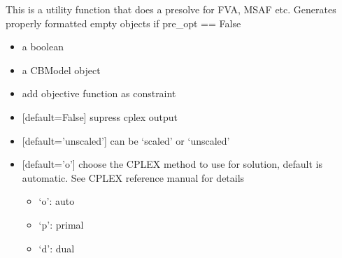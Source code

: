 \documentclass[letterpaper,10pt,english]{sphinxmanual}
\begin{document}
\begin{fulllineitems}
\label{\detokenize{modules_doc:cbmpy.CBCPLEX.cplx_func_GetCPXandPresolve}}
\pysigstartsignatures
{}
\pysigstopsignatures
\sphinxAtStartPar
This is a utility function that does a presolve for FVA, MSAF etc. Generates properly formatted
empty objects if pre\_opt == False
\begin{itemize}
\item {} 
\sphinxAtStartPar
{} a boolean

\item {} 
\sphinxAtStartPar
{} a CBModel object

\item {} 
\sphinxAtStartPar
{} add objective function as constraint

\item {} 
\sphinxAtStartPar
{} {[}default=False{]} supress cplex output

\item {} 
\sphinxAtStartPar
{} {[}default=’unscaled’{]} can be ‘scaled’ or ‘unscaled’

\item {} 
\sphinxAtStartPar
{} {[}default=’o’{]} choose the CPLEX method to use for solution, default is automatic. See CPLEX reference manual for details
\begin{itemize}
\item {} 
\sphinxAtStartPar
‘o’: auto

\item {} 
\sphinxAtStartPar
‘p’: primal

\item {} 
\sphinxAtStartPar
‘d’: dual


\end{itemize}
\end{itemize}
\end{fulllineitems}
\end{document}
